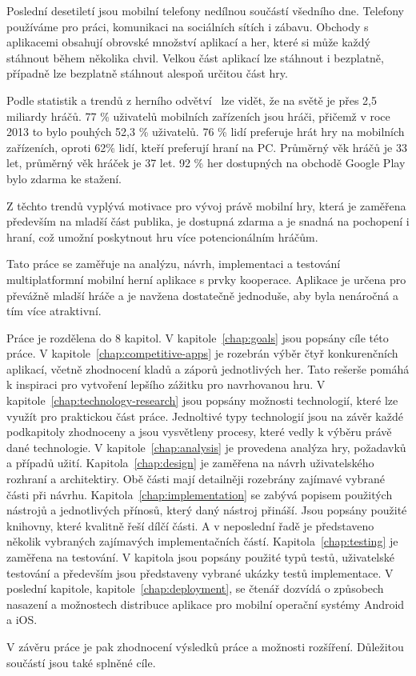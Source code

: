 \begin{introduction}
Poslední desetiletí jsou mobilní telefony nedílnou součástí všedního dne.
Telefony používáme pro práci, komunikaci na sociálních sítích i zábavu.
Obchody s aplikacemi obsahují obrovské množství aplikací a her,
které si může každý stáhnout během několika chvil.
Velkou část aplikací lze stáhnout i bezplatně,
případně lze bezplatně stáhnout alespoň určitou část hry.

Podle statistik a trendů z herního odvětví~\cite{wepc_video_game_statistics}
lze vidět,
že na světě je přes 2,5 miliardy hráčů.
77 \% uživatelů mobilních zařízeních jsou hráči,
přičemž v roce 2013 to bylo pouhých 52,3 \% uživatelů.
76 \% lidí preferuje hrát hry na mobilních zařízeních,
oproti 62\% lidí, kteří preferují hraní na PC.
Průměrný věk hráčů je 33 let, průměrný věk hráček je 37 let.
92 \% her dostupných na obchodě Google Play bylo zdarma ke stažení.

Z těchto trendů vyplývá motivace pro vývoj právě mobilní hry,
která je zaměřena především na mladší část publika,
je dostupná zdarma a je snadná na pochopení i hraní,
což umožní poskytnout hru více potencionálním hráčům.

Tato práce se zaměřuje na analýzu, návrh, implementaci a testování
multiplatformní mobilní herní aplikace s prvky kooperace.
Aplikace je určena pro převážně mladší hráče
a je navžena dostatečně jednoduše,
aby byla nenáročná a tím více atraktivní.

Práce je rozdělena do 8 kapitol.
V kapitole~\ref{chap:goals} jsou popsány cíle této práce.
V kapitole~\ref{chap:competitive-apps} je rozebrán výběr čtyř konkurenčních aplikací,
včetně zhodnocení kladů a záporů jednotlivých her.
Tato rešerše pomáhá k inspiraci pro vytvoření lepšího zážitku pro navrhovanou
hru.
V kapitole~\ref{chap:technology-research} jsou popsány možnosti technologií,
které lze využít pro praktickou část práce.
Jednoltivé typy technologií jsou na závěr každé podkapitoly zhodnoceny
a jsou vysvětleny procesy, které vedly k výběru právě dané technologie.
V kapitole~\ref{chap:analysis} je provedena analýza hry, požadavků a případů užití.
Kapitola~\ref{chap:design} je zaměřena na návrh uživatelského rozhraní a architektiry.
Obě části mají detailněji rozebrány zajímavé vybrané části při návrhu.
Kapitola~\ref{chap:implementation} se zabývá popisem použitých nástrojů
a jednotlivých přínosů, který daný nástroj přináší.
Jsou popsány použité knihovny, které kvalitně řeší dílčí části.
A v neposlední řadě je představeno několik vybraných zajímavých
implementačních částí.
Kapitola~\ref{chap:testing} je zaměřena na testování.
V kapitola jsou popsány použité typů testů,
uživatelské testování a především jsou představeny vybrané ukázky testů
implementace.
V poslední kapitole, kapitole~\ref{chap:deployment}, se čtenář dozvídá o způsobech nasazení a
možnostech distribuce aplikace pro mobilní operační systémy Android a iOS.

V závěru práce je pak zhodnocení výsledků práce a možnosti rozšíření.
Důležitou součástí jsou také splněné cíle.
\end{introduction}
